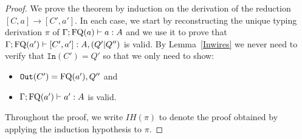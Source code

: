 \documentclass[twoside]{article}
\begin{document}
\begin{proof}
We prove the theorem by induction on the derivation of the reduction 
 $[C,a]\to[C',a']$. In each case, we start by reconstructing 
the unique typing derivation $\pi$ of $\Gamma;\mathop{\textrm{FQ}}\nolimits(a)\vdash a:A$ and we use 
it to prove that $\Gamma;\mathop{\textrm{FQ}}\nolimits(a')\vdash [C',a']:A,(Q'|Q'')$ is valid. 
By Lemma~\hyperref[Inwires]{\ref*{Inwires}} we never need to 
verify that $\mathtt{In}(C')=Q'$ so that we only need to show:
\begin{itemize}
  \item $\mathtt{Out}(C')=\mathop{\textrm{FQ}}\nolimits(a'),Q''$ and
  \item $\Gamma;\mathop{\textrm{FQ}}\nolimits(a')\vdash a':A$ is valid.
\end{itemize}
Throughout the proof, we write $IH(\pi)$ to denote the proof obtained by applying 
the induction hypothesis to $\pi$.


\end{proof}
\end{document}
